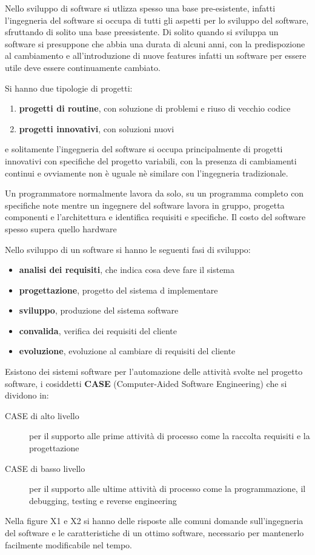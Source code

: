 \documentclass[a4paper,12pt, oneside]{book}
\begin{document}
Nello sviluppo di software si utlizza spesso una base pre-esistente, infatti l'ingegneria del software si occupa
di tutti gli aspetti per lo sviluppo del software, sfruttando di solito una base preesistente. \newline
Di solito quando si sviluppa un software si presuppone che abbia una durata di alcuni anni, con la predispozione
al cambiamento e all'introduzione di nuove features infatti un software per essere utile deve essere continuamente cambiato.

Si hanno due tipologie di progetti:
\begin{enumerate}
	\item \textbf{progetti di routine}, con soluzione di problemi e riuso di vecchio codice
	\item \textbf{progetti innovativi}, con soluzioni nuovi
\end{enumerate}
e solitamente l'ingegneria del software si occupa principalmente di progetti innovativi
con specifiche del progetto variabili, con la presenza di cambiamenti continui e ovviamente
non è uguale nè similare con l'ingegneria tradizionale.

Un programmatore normalmente lavora da solo, su un programma completo con specifiche note mentre un ingegnere del software
lavora in gruppo, progetta componenti e l'architettura e identifica requisiti e specifiche.
Il costo del software spesso supera quello hardware %

Nello sviluppo di un software si hanno le seguenti fasi di sviluppo:
\begin{itemize}
	\item \textbf{analisi dei requisiti}, che indica cosa deve fare il sistema
	\item \textbf{progettazione}, progetto del sistema d implementare
	\item \textbf{sviluppo}, produzione del sistema software
	\item \textbf{convalida}, verifica dei requisiti del cliente
	\item \textbf{evoluzione}, evoluzione al cambiare di requisiti del cliente
\end{itemize}
Esistono dei sistemi software per l'automazione delle attività svolte nel progetto software,
i cosiddetti \textbf{CASE} (Computer-Aided Software Engineering) che si dividono in:
\begin{description}
	\item [CASE di alto livello] per il supporto alle prime attività di processo come la raccolta requisiti e la progettazione
	\item [CASE di basso livello] per il supporto alle ultime attività di processo come la programmazione,
	      il debugging, testing e reverse engineering
\end{description}
Nella figure X1 e X2  si hanno delle risposte alle comuni domande sull'ingegneria del software e le caratteristiche
di un ottimo software, necessario per mantenerlo facilmente modificabile nel tempo.
\end{document}
